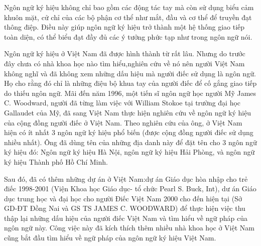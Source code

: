\indent Ngôn ngữ ký hiệu không chỉ bao gồm các động tác tay mà còn sử dụng biểu cảm khuôn mặt, cử chỉ của các bộ phận cơ thể như mắt, đầu và cơ thể để truyền đạt thông điệp. Điều này giúp ngôn ngữ ký hiệu trở thành một hệ thống giao tiếp toàn diện, có thể biểu đạt đầy đủ các ý tưởng phức tạp như trong ngôn ngữ nói.

\indent Ngôn ngữ ký hiệu ở Việt Nam đã được hình thành từ rất lâu. Nhưng do trước đây chưa có nhà khoa học nào tìm hiểu,nghiên cứu về nó nên người Việt Nam không nghĩ và đã không xem những dấu hiệu mà người điếc sử dụng là ngôn ngữ. Họ cho rằng đó chỉ là những điệu bộ khua tay của người điếc để cố gắng giao tiếp do thiếu ngôn ngữ. Mãi đến năm 1996, một tiến sĩ ngôn ngữ học người Mỹ James C. Woodward, người đã từng làm việc với William Stokoe tại trường đại học Gallaudet của Mỹ, đã sang Việt Nam thực hiện nghiên cứu về ngôn ngữ ký hiệu của cộng đồng người điếc ở Việt Nam. Theo nghiên cứu của ông, ở Việt Nam hiện có ít nhất 3 ngôn ngữ ký hiệu phổ biến (được cộng đồng người điếc sử dụng nhiều nhất). Ông đã dùng tên của những địa danh này để đặt tên cho 3 ngôn ngữ ký hiệu đó: Ngôn ngữ ký hiệu Hà Nội, ngôn ngữ ký hiệu Hải Phòng, và ngôn ngữ ký hiệu Thành phố Hồ Chí Minh.

\indent Sau đó, đã có thêm những dự án ở Việt Nam:dự án Giáo dục hòa nhập cho trẻ điếc 1998-2001 (Viện Khoa học Giáo dục- tổ chức Pearl S. Buck, Int), dư án Giáo dục trung học và đại học cho người Điếc Việt Nam 2000 cho đến hiện tại (Sở GD-ĐT Đồng Nai và GS TS JAMES C. WOODWARD) để thực hiện việc thu thập lại những dấu hiệu của người điếc Việt Nam và tìm hiểu về ngữ pháp của ngôn ngữ này. Công việc này đã kích thích thêm nhiều nhà khoa học ở Việt Nam cũng bắt đầu tìm hiểu về ngữ pháp của ngôn ngữ ký hiệu Việt Nam.

